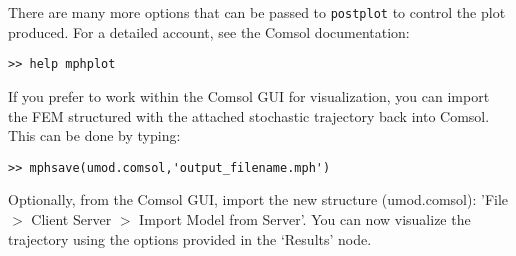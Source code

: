 \noindent
There are many more options that can be passed to \texttt{postplot} to
control the plot produced. For a detailed account, see the Comsol
documentation:
\begin{verbatim}
>> help mphplot
\end{verbatim}

\noindent
If you prefer to work within the Comsol GUI for visualization, you can
import the FEM structured with the attached stochastic trajectory back
into Comsol. This can be done by typing:

\begin{verbatim}
>> mphsave(umod.comsol,'output_filename.mph')
\end{verbatim}

\noindent
Optionally, from the Comsol GUI, import the new structure (umod.comsol): 'File $>$
Client Server  $>$ Import Model from Server'. You can now visualize the trajectory
using the options provided in the `Results' node.
